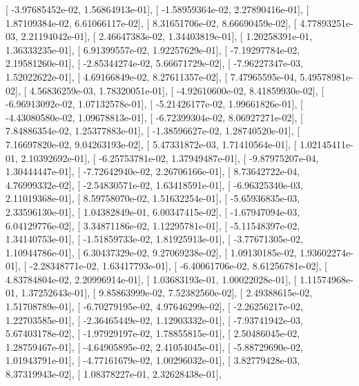 \documentclass{article}
\begin{document}
       [ -3.97685452e-02,   1.56864913e-01],
       [ -1.58959364e-02,   2.27890416e-01],
       [  1.87109384e-02,   6.61066117e-02],
       [  8.31651706e-02,   8.66690459e-02],
       [  4.77893251e-03,   2.21194042e-01],
       [  2.46647383e-02,   1.34403819e-01],
       [  1.20258391e-01,   1.36333235e-01],
       [  6.91399557e-02,   1.92257629e-01],
       [ -7.19297784e-02,   2.19581260e-01],
       [ -2.85344274e-02,   5.66671729e-02],
       [ -7.96227347e-03,   1.52022622e-01],
       [  4.69166849e-02,   8.27611357e-02],
       [  7.47965595e-04,   5.49578981e-02],
       [  4.56836259e-03,   1.78320051e-01],
       [ -4.92610600e-02,   8.41859930e-02],
       [ -6.96913092e-02,   1.07132578e-01],
       [ -5.21426177e-02,   1.99661826e-01],
       [ -4.43080580e-02,   1.09678813e-01],
       [ -6.72399304e-02,   8.06927271e-02],
       [  7.84886354e-02,   1.25377883e-01],
       [ -1.38596627e-02,   1.28740520e-01],
       [  7.16697820e-02,   9.04263193e-02],
       [  5.47331872e-03,   1.71410564e-01],
       [  1.02145411e-01,   2.10392692e-01],
       [ -6.25753781e-02,   1.37949487e-01],
       [ -9.87975207e-04,   1.30444447e-01],
       [ -7.72642940e-02,   2.26706166e-01],
       [  8.73642722e-04,   4.76999332e-02],
       [ -2.54830571e-02,   1.63418591e-01],
       [ -6.96325340e-03,   2.11019368e-01],
       [  8.59758070e-02,   1.51632254e-01],
       [ -5.65936835e-03,   2.33596130e-01],
       [  1.04382849e-01,   6.00347415e-02],
       [ -1.67947094e-03,   6.04129776e-02],
       [  3.34871186e-02,   1.12295781e-01],
       [ -5.11548397e-02,   1.34140753e-01],
       [ -1.51859733e-02,   1.81925913e-01],
       [ -3.77671305e-02,   1.10944786e-01],
       [  6.30437329e-02,   9.27069238e-02],
       [  1.09130185e-02,   1.93602274e-01],
       [ -2.28348771e-02,   1.63417793e-01],
       [ -6.40061706e-02,   8.61256781e-02],
       [  4.83784804e-02,   2.20996914e-01],
       [  1.03683193e-01,   1.00022028e-01],
       [  1.11574968e-01,   1.37252643e-01],
       [  9.85863999e-02,   7.52382560e-02],
       [  2.49388615e-02,   1.51708789e-01],
       [ -6.70279195e-02,   4.97646299e-02],
       [ -2.26256217e-02,   1.22703585e-01],
       [ -2.36465449e-02,   1.12903332e-01],
       [ -7.93741942e-03,   5.67403178e-02],
       [ -1.97929197e-02,   1.78855815e-01],
       [  2.50486045e-02,   1.28759467e-01],
       [ -4.64905895e-02,   2.41054045e-01],
       [ -5.88729690e-02,   1.01943791e-01],
       [ -4.77161679e-02,   1.00296032e-01],
       [  3.82779428e-03,   8.37319943e-02],
       [  1.08378227e-01,   2.32628438e-01],
\end{document}
